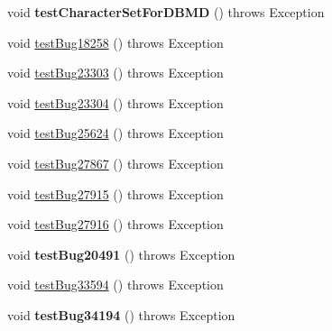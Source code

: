 \begin{DoxyCompactItemize}
\item 
\mbox{\label{classtestsuite_1_1regression_1_1_meta_data_regression_test_aff18615ce9761d601ce3bfbf73901c2a}} 
void {\bfseries test\+Character\+Set\+For\+D\+B\+MD} ()  throws Exception 
\item 
void \mbox{\hyperlink{classtestsuite_1_1regression_1_1_meta_data_regression_test_af1076e63dffd2b6792697be0f509d039}{test\+Bug18258}} ()  throws Exception 
\item 
void \mbox{\hyperlink{classtestsuite_1_1regression_1_1_meta_data_regression_test_a91cb0cb606fa52c6106dad75b768de7a}{test\+Bug23303}} ()  throws Exception 
\item 
void \mbox{\hyperlink{classtestsuite_1_1regression_1_1_meta_data_regression_test_a5182df6da64a360d62191fc3be70fa75}{test\+Bug23304}} ()  throws Exception 
\item 
void \mbox{\hyperlink{classtestsuite_1_1regression_1_1_meta_data_regression_test_a2a97b03d5a86fcd988e7648006a385a6}{test\+Bug25624}} ()  throws Exception 
\item 
void \mbox{\hyperlink{classtestsuite_1_1regression_1_1_meta_data_regression_test_ad4bf6071c2581485e1d8d44e36d385ae}{test\+Bug27867}} ()  throws Exception 
\item 
void \mbox{\hyperlink{classtestsuite_1_1regression_1_1_meta_data_regression_test_a32361bc11ddd1b2990adfa15697e27ae}{test\+Bug27915}} ()  throws Exception 
\item 
void \mbox{\hyperlink{classtestsuite_1_1regression_1_1_meta_data_regression_test_a360ac39f54be19d70c9d43f584bc6f0f}{test\+Bug27916}} ()  throws Exception 
\item 
\mbox{\label{classtestsuite_1_1regression_1_1_meta_data_regression_test_abb3327e750cc332fa6f7a293572b16e1}} 
void {\bfseries test\+Bug20491} ()  throws Exception 
\item 
void \mbox{\hyperlink{classtestsuite_1_1regression_1_1_meta_data_regression_test_adb0cee1c23451feae0c5ee851ee0d5ba}{test\+Bug33594}} ()  throws Exception 
\item 
\mbox{\label{classtestsuite_1_1regression_1_1_meta_data_regression_test_ac79bd5bb01b78e780d95f5d0fb285541}} 
void {\bfseries test\+Bug34194} ()  throws Exception 
\item 

\end{DoxyCompactItemize}
